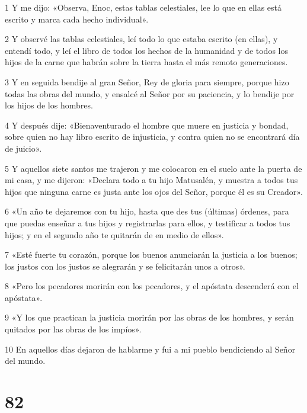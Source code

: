 \par 1 Y me dijo: «Observa, Enoc, estas tablas celestiales, lee lo que en ellas está escrito y marca cada hecho individual».
\par 2 Y observé las tablas celestiales, leí todo lo que estaba escrito (en ellas), y entendí todo, y leí el libro de todos los hechos de la humanidad y de todos los hijos de la carne que habrán sobre la tierra hasta el más remoto generaciones.
\par 3 Y en seguida bendije al gran Señor, Rey de gloria para siempre, porque hizo todas las obras del mundo, y ensalcé al Señor por su paciencia, y lo bendije por los hijos de los hombres.
\par 4 Y después dije: «Bienaventurado el hombre que muere en justicia y bondad, sobre quien no hay libro escrito de injusticia, y contra quien no se encontrará día de juicio».
\par 5 Y aquellos siete santos me trajeron y me colocaron en el suelo ante la puerta de mi casa, y me dijeron: «Declara todo a tu hijo Matusalén, y muestra a todos tus hijos que ninguna carne es justa ante los ojos del Señor, porque él es su Creador».
\par 6 «Un año te dejaremos con tu hijo, hasta que des tus (últimas) órdenes, para que puedas enseñar a tus hijos y registrarlas para ellos, y testificar a todos tus hijos; y en el segundo año te quitarán de en medio de ellos».
\par 7 «Esté fuerte tu corazón, porque los buenos anunciarán la justicia a los buenos; los justos con los justos se alegrarán y se felicitarán unos a otros».
\par 8 «Pero los pecadores morirán con los pecadores, y el apóstata descenderá con el apóstata».
\par 9 «Y los que practican la justicia morirán por las obras de los hombres, y serán quitados por las obras de los impíos».
\par 10 En aquellos días dejaron de hablarme y fui a mi pueblo bendiciendo al Señor del mundo.

\chapter{82}


